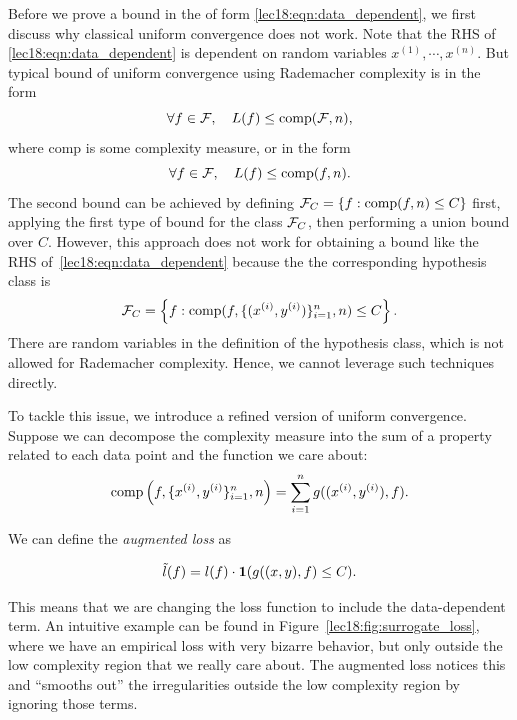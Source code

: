 Before we prove a bound in the of form \eqref{lec18:eqn:data_dependent}, we first discuss why classical uniform convergence does not work. Note that the RHS of \eqref{lec18:eqn:data_dependent} is dependent on random variables $x^{(1)}, \cdots, x^{(n)}$. But typical bound of uniform convergence using Rademacher complexity is in the form
\begin{equation}
\forall f \in \mathcal F,\quad L(f) \leq \text{comp}(\mathcal F, n),
\end{equation}
where $\text{comp}$ is some complexity measure, or in the form
\begin{equation}
\forall f \in \mathcal F, \quad L(f) \leq \text{comp}(f, n).
\end{equation}
The second bound can be achieved by defining $\mathcal F_C= \{f: \text{comp}(f, n)\leq C\}$ first, applying the first type of bound for the class $\mathcal F_C$, then performing a union bound over $C$. However, this approach does not work for obtaining a bound like the RHS of~\eqref{lec18:eqn:data_dependent} because the the corresponding hypothesis class is
\begin{equation}
\mathcal F_C = \left\{f: \text{comp}(f, \{ (x^{(i)}, y^{(i)}) \}_{i=1}^n, n) \leq C \right\}.
\end{equation}
There are random variables in the definition of the hypothesis class, which is not allowed for Rademacher complexity. Hence, we cannot leverage such techniques directly.

To tackle this issue, we introduce a refined version of uniform convergence. Suppose we can decompose the complexity measure into the sum of a property related to each data point and the function we care about:
\begin{align}
\text{comp} \left(f, \{x^{(i)}, y^{(i)} \}_{i=1}^n, n \right) = \sum_{i=1}^n g((x^{(i)}, y^{(i)}), f).
\end{align}

We can define the \textit{augmented loss} as

\begin{align}
\Tilde{l} (f) = l(f) \cdot \bm{1} (g((x, y), f) \le C).
\end{align}

This means that we are changing the loss function to include the data-dependent term. An intuitive example can be found in Figure~\ref{lec18:fig:surrogate_loss}, where we have an empirical loss with very bizarre behavior, but only outside the low complexity region that we really care about. The augmented loss notices this and ``smooths out'' the irregularities outside the low complexity region by ignoring those terms.

